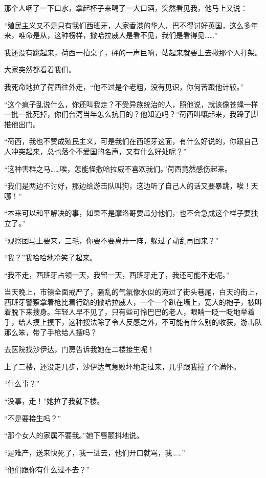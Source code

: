 \par 那个人咽了一下口水，拿起杯子来喝了一大口酒，突然看见我，他马上又说：
\par “殖民主义又不是只有我们西班牙，人家香港的华人，巴不得讨好英国，这么多年来，唯命是从，这种榜样，撒哈拉威人是看不见，我们是看得见……”
\par 我还没有跳起来，荷西一拍桌子，砰的一声巨响，站起来就要上去揪那个人打架。
\par 大家突然都看着我们。
\par 我死命地拉了荷西往外走，“他不过是个老粗，没有见识，你何苦跟他计较。”
\par “这个疯子乱说什么，你还叫我走？不受异族统治的人，照他说，就该像苍蝇一样一批一批死掉，你们台湾当年怎么抗日的？他知道吗？”荷西叫嚷起来，我跺了脚推他出门。
\par “荷西，我也不赞成殖民主义，可是我们在西班牙这面，有什么好说的，你跟自己人冲突起来，总也落个不爱国的名声，又有什么好处呢？”
\par “这种害群之马……唉，怎能怪撒哈拉威不喜欢我们。”荷西竟然感伤起来。
\par “我们是两边不讨好，那边给游击队叫狗，这边听了自己人的话又要暴跳，唉！天哪！”
\par “本来可以和平解决的事，如果不是摩洛哥要瓜分他们，也不会急成这个样子要独立了。”
\par “观察团马上要来，三毛，你要不要离开一阵，躲过了动乱再回来？”
\par “我？”我哈哈地冷笑了起来。
\par “我不走，西班牙占领一天，我留一天，西班牙走了，我还可能不走呢。”
\par 当天晚上，市镇全面戒严了，骚乱的气氛像水似的淹过了街头巷尾，白天的街上，西班牙警察拿着枪比着行路的撒哈拉威人，一个一个趴在墙上，宽大的袍子，被叫着脱下来搜身。年轻人早不见了，只有些可怜巴巴的老人，眼睛一眨一眨地举着手，给人摸上摸下，这种搜法除了令人反感之外，不可能有什么别的收获，游击队那么笨，带了手枪给人搜吗？
\par 去医院找沙伊达，门房告诉我她在二楼接生呢！
\par 上了二楼，还没走几步，沙伊达气急败坏地走过来，几乎跟我撞了个满怀。
\par “什么事？”
\par “没事，走！”她拉了我就下楼。
\par “不是要接生吗？”
\par “那个女人的家属不要我。”她下唇颤抖地说。
\par “是难产，送来快死了，我一进去，他们开口就骂，我……”
\par “他们跟你有什么过不去？”
